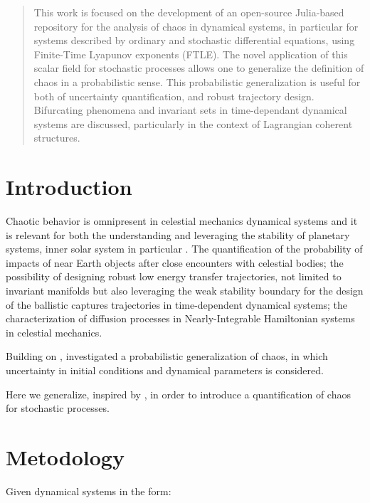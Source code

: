 \documentclass{juliacon}
\begin{document}


\maketitle

\begin{abstract}

This work is focused on the development of an open-source Julia-based repository for the analysis of chaos in dynamical systems, 
in particular for systems described by ordinary and stochastic differential equations, using Finite-Time Lyapunov exponents (FTLE).
The novel application of this scalar field for stochastic processes allows one to generalize the definition of chaos in a probabilistic sense.
This probabilistic generalization is useful for both of uncertainty quantification, and robust trajectory design.
Bifurcating phenomena and invariant sets in time-dependant dynamical systems are discussed, particularly in the context of Lagrangian coherent structures.

\end{abstract}

\section{Introduction}

Chaotic behavior is omnipresent in celestial mechanics dynamical systems and it is relevant for both the understanding and 
leveraging the stability of planetary systems, inner solar system in particular \cite{celletti}. 
The quantification of the probability of impacts of near Earth objects after close encounters with celestial bodies; 
the possibility of designing robust low energy transfer trajectories, not limited to invariant manifolds but also leveraging the 
weak stability boundary for the design of the ballistic captures trajectories in time-dependent dynamical systems; 
the characterization of diffusion processes in Nearly-Integrable Hamiltonian systems in celestial mechanics. 

Building on \cite{Szebehely82}, \cite{ManziAAS2020, VasileManzi} investigated a probabilistic generalization of chaos, in which uncertainty in initial conditions and dynamical parameters is considered.

Here we generalize, inspired by \cite{Balibrea-Iniesta}, in order to introduce a quantification of chaos for stochastic processes.

\section{Metodology}
Given dynamical systems in the form:
\end{document}
